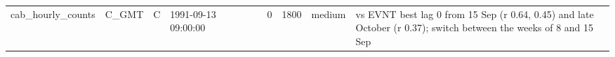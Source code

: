 \begin{landscape}
{\begin{longtable}{>{\raggedright}p{2.7cm}>{\raggedright}p{2.6cm}c>{\raggedright}p{1.6cm}>{\raggedright}p{1.6cm}>{\raggedright}p{2.9cm}rrrl>{\raggedright\arraybackslash}p{5.5cm}}
cab\_hourly\_counts & C\_\allowbreak{}GMT & C & 1991-09-13 09:00:00 &  &  &  & 0 & 1800 & medium & vs EVNT best lag 0 from 15 Sep (r 0.64, 0.45) and late October (r 0.37); switch between the weeks of 8 and 15 Sep\\
\end{longtable}
}
\end{landscape}
